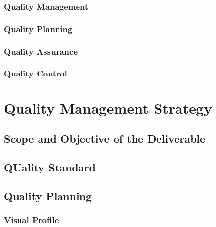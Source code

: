 \documentclass[
  11pt,
]{article}
\begin{document}
\hypertarget{quality-management}{%
\subsubsection{Quality Management}\label{quality-management}}

\hypertarget{quality-planning}{%
\subsubsection{Quality Planning}\label{quality-planning}}

\hypertarget{quality-assurance}{%
\subsubsection{Quality Assurance}\label{quality-assurance}}

\hypertarget{quality-control}{%
\subsubsection{Quality Control}\label{quality-control}}

\clearpage

\hypertarget{quality-management-strategy}{%
\section{Quality Management
Strategy}\label{quality-management-strategy}}

\hypertarget{scope-and-objective-of-the-deliverable}{%
\subsection{Scope and Objective of the
Deliverable}\label{scope-and-objective-of-the-deliverable}}

\hypertarget{quality-standard}{%
\subsection{QUality Standard}\label{quality-standard}}

\hypertarget{quality-planning-1}{%
\subsection{Quality Planning}\label{quality-planning-1}}

\hypertarget{visual-profile}{%
\subsubsection{Visual Profile}\label{visual-profile}}
\end{document}

